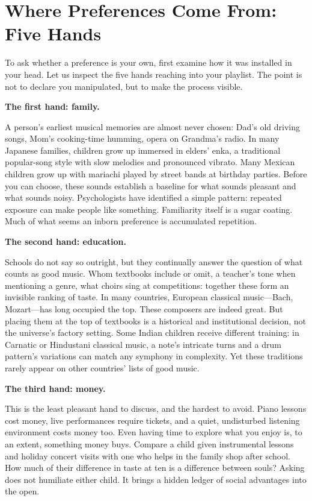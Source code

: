 \section{Where Preferences Come From: Five Hands}
To ask whether a preference is your own, first examine how it was installed in your head. Let us inspect the five hands reaching into your playlist. The point is not to declare you manipulated, but to make the process visible.

\textbf{The first hand: family.}

A person's earliest musical memories are almost never chosen: Dad's old driving songs, Mom's cooking-time humming, opera on Grandma's radio. In many Japanese families, children grow up immersed in elders' enka, a traditional popular-song style with slow melodies and pronounced vibrato. Many Mexican children grow up with mariachi played by street bands at birthday parties. Before you can choose, these sounds establish a baseline for what sounds pleasant and what sounds noisy. Psychologists have identified a simple pattern: repeated exposure can make people like something. Familiarity itself is a sugar coating. Much of what seems an inborn preference is accumulated repetition.

\textbf{The second hand: education.}

Schools do not say so outright, but they continually answer the question of what counts as good music. Whom textbooks include or omit, a teacher's tone when mentioning a genre, what choirs sing at competitions: together these form an invisible ranking of taste. In many countries, European classical music---Bach, Mozart---has long occupied the top. These composers are indeed great. But placing them at the top of textbooks is a historical and institutional decision, not the universe's factory setting. Some Indian children receive different training: in Carnatic or Hindustani classical music, a note's intricate turns and a drum pattern's variations can match any symphony in complexity. Yet these traditions rarely appear on other countries' lists of good music.

\textbf{The third hand: money.}

This is the least pleasant hand to discuss, and the hardest to avoid. Piano lessons cost money, live performances require tickets, and a quiet, undisturbed listening environment costs money too. Even having time to explore what you enjoy is, to an extent, something money buys. Compare a child given instrumental lessons and holiday concert visits with one who helps in the family shop after school. How much of their difference in taste at ten is a difference between souls? Asking does not humiliate either child. It brings a hidden ledger of social advantages into the open.

